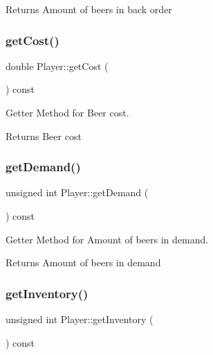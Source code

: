 \begin{DoxyReturn}{Returns}
Amount of beers in back order 
\end{DoxyReturn}
\mbox{\label{classPlayer_a38cf576aa5a4020ed2fafe1aa9046fdd}} 
\subsubsection{\texorpdfstring{get\+Cost()}{getCost()}}
{\footnotesize\ttfamily double Player\+::get\+Cost (\begin{DoxyParamCaption}{ }\end{DoxyParamCaption}) const}



Getter Method for Beer cost. 

\begin{DoxyReturn}{Returns}
Beer cost 
\end{DoxyReturn}
\mbox{\label{classPlayer_ade2a771c2e4a42560dae2acf2041ba8b}} 
\subsubsection{\texorpdfstring{get\+Demand()}{getDemand()}}
{\footnotesize\ttfamily unsigned int Player\+::get\+Demand (\begin{DoxyParamCaption}{ }\end{DoxyParamCaption}) const}



Getter Method for Amount of beers in demand. 

\begin{DoxyReturn}{Returns}
Amount of beers in demand 
\end{DoxyReturn}
\mbox{\label{classPlayer_ac0da2a656e267a7f06be30c9e99d26e6}} 
\subsubsection{\texorpdfstring{get\+Inventory()}{getInventory()}}
{\footnotesize\ttfamily unsigned int Player\+::get\+Inventory (\begin{DoxyParamCaption}{ }\end{DoxyParamCaption}) const}



